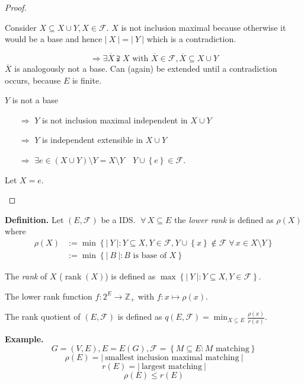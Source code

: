 \documentclass{article}
\newcommand{\card}[1]{\left|\:\!#1\:\!\right|}
\newcommand{\set}[1]{\left\{#1\right\}}
\newcommand{\fall}{\;\forall\,}
\DeclareMathOperator{\rank}{rank}
\begin{document}
\begin{proof}
\begin{itemize}
    Consider $X \subseteq X \cup Y, X \in \mathcal{F}$. $X$ is not inclusion maximal because otherwise it would be a base and hence $\card{X} = \card{Y}$ which is a contradiction.

    \[
      \Rightarrow \exists \overline{X} \supsetneqq X \text{ with } \overline{X} \in \mathcal{F}, \overline{X} \subseteq X \cup Y
    \]
    $\overline{X}$ is analogously not a base. Can (again) be extended until a contradiction occurs, because $E$ is finite.

    $Y$ is not a base
    \begin{itemize}
      \item[$\Rightarrow$] $Y$ is not inclusion maximal independent in $X \cup Y$
      \item[$\Rightarrow$] $Y$ is independent extensible in $X \cup Y$
      \item[$\Rightarrow$] $\exists e \in (X \cup Y) \setminus Y = X \setminus Y \quad Y \cup \set{e} \in \mathcal{F}$.
    \end{itemize}
    Let $X = e$.
  \end{itemize}
\end{proof}

\textbf{Definition.}
  Let $(E, \mathcal{F})$ be a IDS. $\fall X \subseteq E$ the \emph{lower rank} is defined as $\rho(X)$ where
  \begin{align*}
      \rho(X)
        &:= \min\set{\card{Y}: Y \subseteq X,
          Y \in \mathcal{F},
          Y \cup \set{x} \notin \mathcal{F}
          \fall x \in X \setminus Y
        } \\
        & := \min\set{\card{B}: B \text{ is base of } X}
  \end{align*}

  The \emph{rank} of $X$ ($\rank(X)$) is defined as $\max\set{\card{Y}: Y \subseteq X, Y \in \mathcal{F}}$.

  The lower rank function $f: 2^E \rightarrow \mathbb{Z}_+$ with $f: x \mapsto \rho(x)$.

  The rank quotient of $(E, \mathcal{F})$ is defined as $q(E, \mathcal{F}) = \min_{X \subseteq E} \frac{\rho(x)}{r(x)}$.

\textbf{Example.}
  \[ G = (V, E), E = E(G), \mathcal{F} = \set{M \subseteq E: M \text{ matching}} \]
  \[ \rho(E) = \card{\text{smallest inclusion maximal matching}} \]
  \[ r(E) = \card{\text{largest matching}} \]
  \[ \rho(E) \leq r(E) \]
\end{document}
